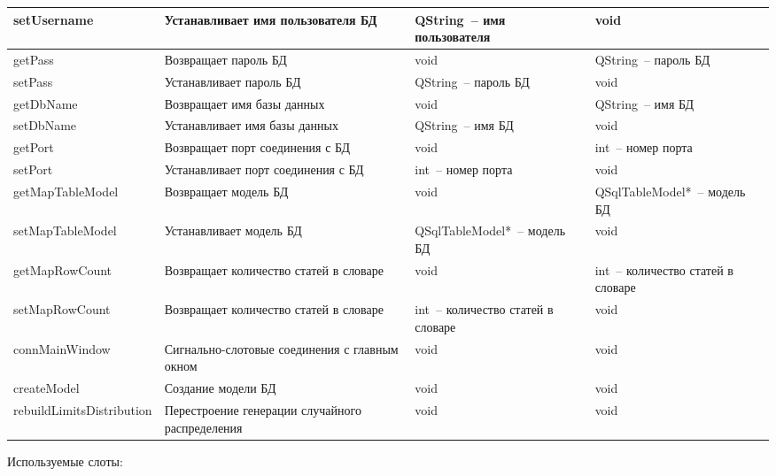 \documentclass[a4paper,14pt,russian]{extreport}
\begin{document}
\begin{longtable}{|m{3 cm}|m{3 cm}|m{4 cm}|m{4 cm}|}
\hline
{set\-Username} & Устанавливает имя пользователя БД & QString~-- имя пользователя & void \\
\hline
getPass & Возвращает пароль БД & void & QString~-- пароль БД \\
\hline
setPass & Устанавливает пароль БД & QString~-- пароль БД & void \\
\hline
{getDb\-Name} & Возвращает имя базы данных & void & QString~-- имя БД \\
\hline
{setDb\-Name} & Устанавливает имя базы данных & QString~-- имя БД & void \\
\hline
getPort & Возвращает порт соединения с БД & void & int~-- номер порта \\
\hline
setPort & Устанавливает порт соединения с БД & int~-- номер порта & void \\
\hline
{get\-Map\-Table\-Model} & Возвращает модель БД & void & {QSql\-Table\-Model*}~-- модель БД \\
\hline
{set\-Map\-Table\-Model} & Устанавливает модель БД & {QSql\-Table\-Model*}~-- модель БД & void \\
\hline
{get\-Map\-Row\-Count} & Возвращает количество статей в словаре & void & int~-- количество статей в словаре \\
\hline
{set\-Map\-Row\-Count} & Возвращает количество статей в словаре & int~-- количество статей в словаре & void \\
\hline
{conn\-Main\-Window} & Сигнально-слотовые соединения с главным окном & void & void \\
\hline
{create\-Model} & Создание модели БД & void & void \\
\hline
{rebuild\-Limits\-Distribution} & Перестроение генерации случайного распределения & void & void \\
\hline
\end{longtable}

Используемые слоты:
\end{document}
